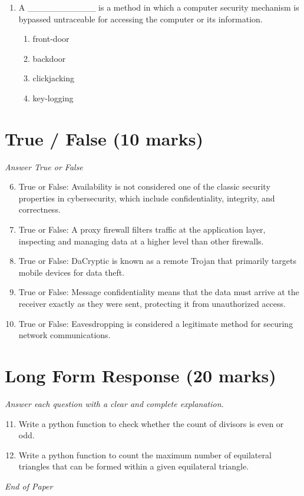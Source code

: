 \documentclass[12pt]{article}
\begin{document}
\begin{enumerate}[label=\arabic*.]
\begin{enumerate}[label=(\alph*)]
    \item Clickjacking
\end{enumerate}
\item A \_\_\_\_\_\_\_\_\_\_\_ is a method in which a computer security mechanism is bypassed untraceable for accessing the computer or its information.
\begin{enumerate}[label=(\alph*)]
    \item front-door
    \item backdoor
    \item clickjacking
    \item key-logging
\end{enumerate}
\end{enumerate}

\section*{True / False (10 marks)}
\textit{Answer True or False}
\begin{enumerate}[label=\arabic*.]
\setcounter{enumi}{5}
\item True or False: Availability is not considered one of the classic security properties in cybersecurity, which include confidentiality, integrity, and correctness.
\item True or False: A proxy firewall filters traffic at the application layer, inspecting and managing data at a higher level than other firewalls.
\item True or False: DaCryptic is known as a remote Trojan that primarily targets mobile devices for data theft.
\item True or False: Message confidentiality means that the data must arrive at the receiver exactly as they were sent, protecting it from unauthorized access.
\item True or False: Eavesdropping is considered a legitimate method for securing network communications.
\end{enumerate}

\section*{Long Form Response (20 marks)}
\textit{Answer each question with a clear and complete explanation.}
\begin{enumerate}[label=\arabic*.]
\setcounter{enumi}{10}
\item Write a python function to check whether the count of divisors is even or odd.
\item Write a python function to count the maximum number of equilateral triangles that can be formed within a given equilateral triangle.
\end{enumerate}

\vfill
\noindent\textit{End of Paper}
\end{document}
